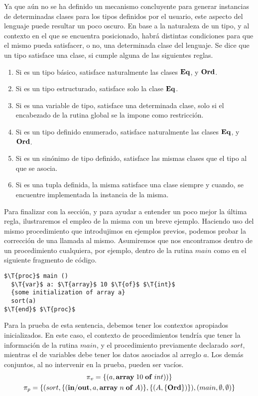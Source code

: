 \documentclass{article}
\begin{document}
Ya que aún no se ha definido un mecanismo concluyente para generar instancias de determinadas clases para los tipos definidos por el usuario, este aspecto del lenguaje puede resultar un poco oscuro.
En base a la naturaleza de un tipo, y al contexto en el que se encuentra posicionado, habrá distintas condiciones para que el mismo pueda satisfacer, o no, una determinada clase del lenguaje.
Se dice que un tipo satisface una clase, si cumple alguna de las siguientes reglas.
\begin{enumerate}
\item Si es un tipo básico, satisface naturalmente las clases $\mathbf{Eq}$, y $\mathbf{Ord}$.
\item Si es un tipo estructurado, satisface solo la clase $\mathbf{Eq}$.
\item Si es una variable de tipo, satisface una determinada clase, solo si el encabezado de la rutina global se la impone como restricción.
\item Si es un tipo definido enumerado, satisface naturalmente las clases $\mathbf{Eq}$, y $\mathbf{Ord}$.
\item Si es un sinónimo de tipo definido, satisface las mismas clases que el tipo al que se asocia.
\item Si es una tupla definida, la misma satisface una clase siempre y cuando, se encuentre implementada la instancia de la misma.
\end{enumerate}

Para finalizar con la sección, y para ayudar a entender un poco mejor la última regla, ilustraremos el empleo de la misma con un breve ejemplo.
Haciendo uso del mismo procedimiento que introdujimos en ejemplos previos, podemos probar la corrección de una llamada al mismo.
Asumiremos que nos encontramos dentro de un procedimiento cualquiera, por ejemplo, dentro de la rutina $main$ como en el siguiente fragmento de código.
\begin{lstlisting}[style = code]
$\T{proc}$ main ()
  $\T{var}$ a: $\T{array}$ 10 $\T{of}$ $\T{int}$
  {some initialization of array a}
  sort(a)
$\T{end}$ $\T{proc}$
\end{lstlisting}

Para la prueba de esta sentencia, debemos tener los contextos apropiados inicializados.
En este caso, el contexto de procedimientos tendría que tener la información de la rutina $main$, y el procedimiento previamente declarado $sort$, mientras el de variables debe tener los datos asociados al arreglo $a$.
Los demás conjuntos, al no intervenir en la prueba, pueden ser vacíos.
\begin{gather*}
\pi_{v} = \{ (a, \mathbf{array} \; 10 \; \mathbf{of} \; int)) \}
\\
\pi_{p} =
\{
( sort, \{ (\mathbf{in/out}, a, \mathbf{array} \; n \; \mathbf{of} \; A) \}, \{ (A, \{ \mathbf{Ord} \}) \} )
,
( main, \emptyset, \emptyset )
\}
\end{gather*}
\end{document}
